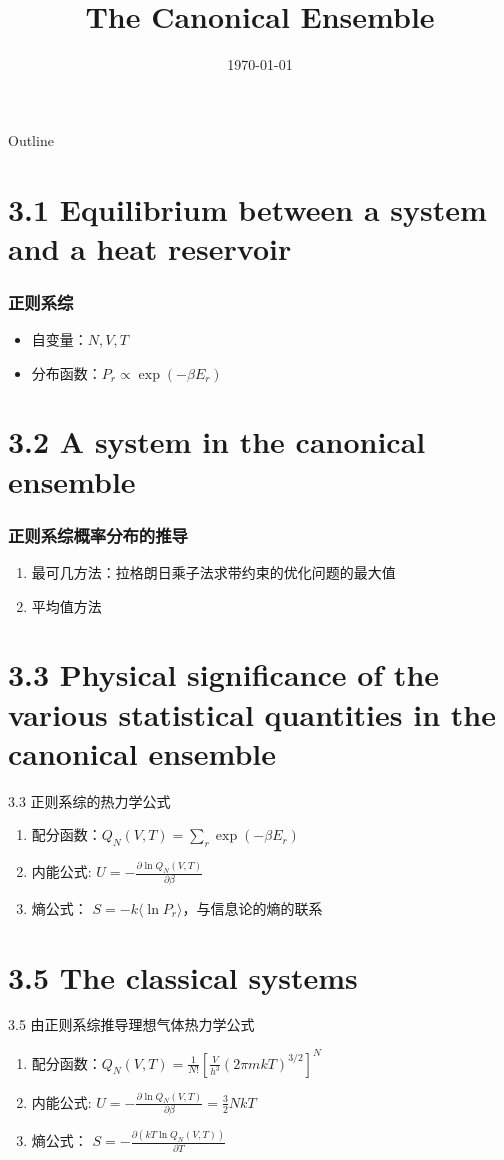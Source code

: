 \documentclass{ctexbeamer}
\title{The Canonical Ensemble}
\date{\today}
\begin{document}
\begin{frame}
	\titlepage
\end{frame}
\begin{frame}{Outline}
    \tableofcontents
\end{frame}
\section{3.1 Equilibrium between 
a system and a heat reservoir
}

\begin{frame}
\frametitle{正则系综}
\begin{itemize}
    \item 自变量：$N,V,T$
    \item 分布函数：$P_r \propto \exp(-\beta E_r)$
\end{itemize}

\end{frame}
\section{3.2 A system in the canonical ensemble
}
\begin{frame}
    \frametitle{正则系综概率分布的推导}
    \begin{enumerate}
        \item 最可几方法：拉格朗日乘子法求带约束的优化问题的最大值
        \item 平均值方法
    \end{enumerate}
    
    \end{frame}
\section{3.3 Physical significance of the various statistical quantities in
the canonical ensemble}
\begin{frame}{3.3 正则系综的热力学公式}
    \begin{enumerate}
        \item 配分函数：$Q_N(V,T) = \sum_{r} \exp(- \beta E_r)$
        \item 内能公式: $U=-\frac{\partial \ln Q_N(V,T)}{\partial \beta}$
        \item 熵公式： $S=-k\langle \ln P_r \rangle$，与信息论的熵的联系
    \end{enumerate}
\end{frame}
\section{3.5 The classical systems}
\begin{frame}{3.5 由正则系综推导理想气体热力学公式}
    \begin{enumerate}
        \item 配分函数：$Q_N(V,T) = \frac{1}{N!} \left[ \frac{V}{h^3}(2\pi mkT)^{3/2} \right]^N$
        \item 内能公式: $U=-\frac{\partial \ln Q_N(V,T)}{\partial \beta}=\frac{3}{2}NkT$
        \item 熵公式： $S=-\frac{ \partial (kT \ln Q_N(V,T))}
        { \partial T}$
    \end{enumerate}
\end{frame}
\end{document}
